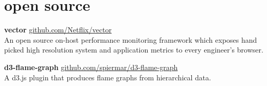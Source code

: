 \section{open source}

\textbf{vector}
\newline
\vspace{\parsep}
{ \href{https://github.com/Netflix/vector}{github.com/Netflix/vector}}\\
An open source on-host performance monitoring framework which exposes hand picked high resolution system and application metrics to every engineer’s browser.
\newline
\vspace{\parsep}

\textbf{d3-flame-graph}
\newline
\vspace{\parsep}
{ \href{https://github.com/spiermar/d3-flame-graph}{github.com/spiermar/d3-flame-graph}}\\
A d3.js plugin that produces flame graphs from hierarchical data.
\newline
\vspace{\parsep}
